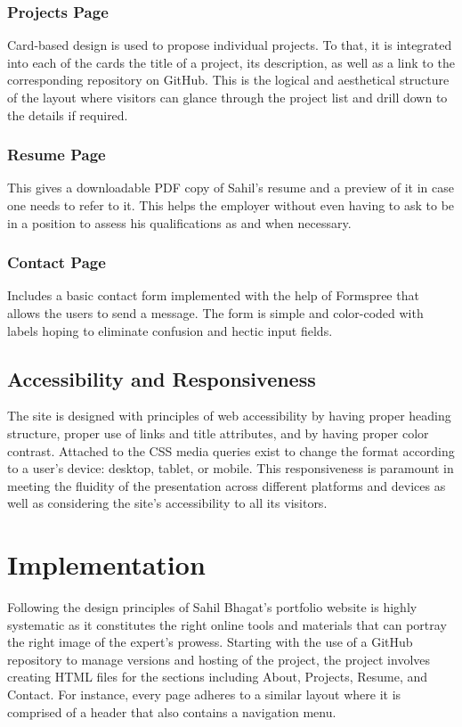 \documentclass{article}
\begin{document}
\subsubsection{Projects Page}
Card-based design is used to propose individual projects. To that, it is integrated into each of the cards the title of a project, its description, as well as a link to the corresponding repository on GitHub. This is the logical and aesthetical structure of the layout where visitors can glance through the project list and drill down to the details if required. 

\subsubsection{Resume Page}
This gives a downloadable PDF copy of Sahil’s resume and a preview of it in case one needs to refer to it. This helps the employer without even having to ask to be in a position to assess his qualifications as and when necessary. 

\subsubsection{Contact Page}
Includes a basic contact form implemented with the help of Formspree that allows the users to send a message. The form is simple and color-coded with labels hoping to eliminate confusion and hectic input fields. 

\subsection{Accessibility and Responsiveness}
The site is designed with principles of web accessibility by having proper heading structure, proper use of links and title attributes, and by having proper color contrast. Attached to the CSS media queries exist to change the format according to a user’s device: desktop, tablet, or mobile. This responsiveness is paramount in meeting the fluidity of the presentation across different platforms and devices as well as considering the site’s accessibility to all its visitors.

\section{Implementation}
Following the design principles of Sahil Bhagat’s portfolio website is highly systematic as it constitutes the right online tools and materials that can portray the right image of the expert’s prowess. Starting with the use of a GitHub repository to manage versions and hosting of the project, the project involves creating HTML files for the sections including About, Projects, Resume, and Contact. For instance, every page adheres to a similar layout where it is comprised of a header that also contains a navigation menu. 
\end{document}
